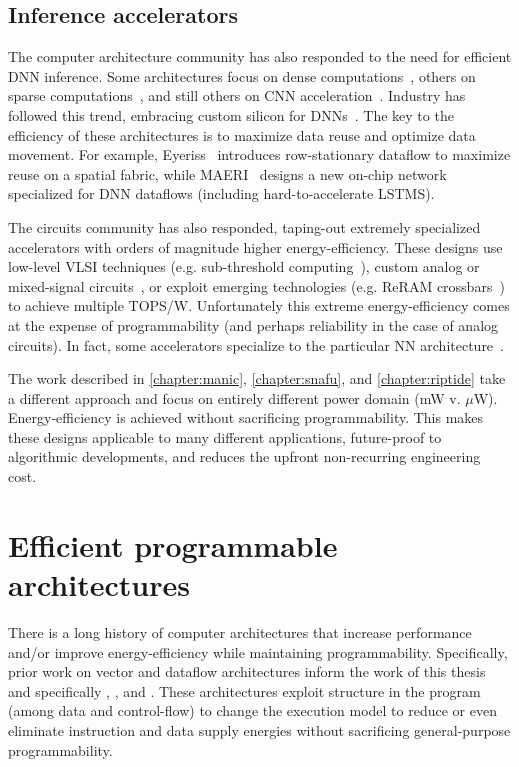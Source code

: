 \subsection{Inference accelerators}
The computer architecture community has also responded to the need for efficient DNN inference.
% 
Some architectures focus on dense computations~\cite{chen:isca16:eyeriss,
chen:asplos14:diannao, chen2014dadiannao}, others on sparse
computations~\cite{han:isca16:eie, du:isca15:shidiannao, maeri,
zhang2016cambricon}, and still others on CNN
acceleration~\cite{alwani2016fused,parashar:isca17:scnn, albericio2016cnvlutin, ding2017circnn, ren2017sc, song2018insitu}.  
%
Industry has followed this trend, embracing custom silicon for
DNNs~\cite{jouppi:isca17:tpu}.
% 
The key to the efficiency of these architectures is to maximize data reuse and
optimize data movement.
% 
For example, Eyeriss~\cite{chen:isca16:eyeriss} introduces row-stationary dataflow to maximize reuse on a spatial fabric, while MAERI~\cite{maeri} designs a new on-chip network specialized for DNN dataflows (including hard-to-accelerate LSTMS).

The circuits community has also responded, taping-out extremely specialized accelerators with orders of magnitude higher energy-efficiency.
%
These designs use low-level VLSI techniques (e.g. sub-threshold computing~\cite{fick2017subthresholdinference}), custom analog or mixed-signal circuits~\cite{bankman2018always}, or exploit emerging technologies (e.g. ReRAM crossbars~\cite{xue201924,xue202015}) to achieve multiple TOPS/W.
% 
Unfortunately this extreme energy-efficiency comes at the expense of programmability (and perhaps reliability in the case of analog circuits).
% 
In fact, some accelerators specialize to the particular NN architecture~\cite{bankman2018always}.

The work described in \autoref{chapter:manic}, \autoref{chapter:snafu}, and \autoref{chapter:riptide} take a different approach and focus on entirely different power domain (mW v. $\mu$W).
% 
Energy-efficiency is achieved without sacrificing programmability.
% 
This makes these designs applicable to many different applications, future-proof to algorithmic developments, and reduces the upfront non-recurring engineering cost.

\section{Efficient programmable architectures}
There is a long history of computer architectures that increase performance and/or improve energy-efficiency while maintaining programmability.
% 
Specifically, prior work on vector and dataflow architectures inform the work of this thesis and specifically \manic, \snafu, and \riptide.
% 
% 
These architectures exploit structure in the program (among data and control-flow) to change the execution model to reduce or even eliminate instruction and data supply energies without sacrificing general-purpose programmability.

